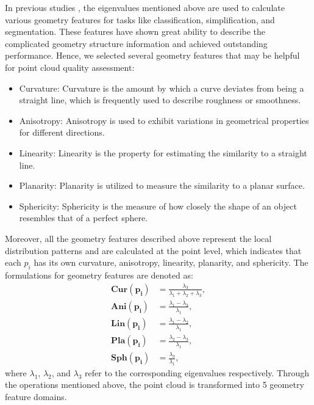 \documentclass[lettersize,journal]{IEEEtran}
\begin{document}
In previous studies \cite{pcqa-curvature2} \cite{pc-eigenvalue1}, the eigenvalues mentioned above are used to calculate various geometry features for tasks like classification, simplification, and segmentation. These features have shown great ability to describe the complicated geometry structure information and achieved outstanding performance. Hence, we selected several geometry features that may be helpful for point cloud quality assessment: 
\begin{itemize}
    \item Curvature: Curvature is the amount by which a curve deviates from being a straight line, which is frequently used to describe roughness or smoothness.
    \item Anisotropy: Anisotropy is used to exhibit variations in geometrical properties for different directions.
    \item Linearity: Linearity is the property for estimating the similarity to a straight line.
    \item Planarity: Planarity is utilized to measure the similarity to a planar surface.
    \item Sphericity: Sphericity is the measure of how closely the shape of an object resembles that of a perfect sphere. 
\end{itemize}


Moreover, all the geometry features described above represent the local distribution patterns and are calculated at the point level, which indicates that each $p_{i}$ has its own curvature, anisotropy, linearity, planarity, and sphericity.
The formulations \cite{pc-eigenvalue2} for geometry features are denoted as:
\begin{align}
     \boldsymbol{Cur(p_{i})}&= \frac{\lambda_{3}}{\lambda_{1}+\lambda_{2}+\lambda_{3}}, \\
     \boldsymbol{Ani(p_{i})}&= \frac{\lambda_{1}-\lambda_{3}}{\lambda_{1}}, \\
    \boldsymbol{Lin(p_{i})}&= \frac{\lambda_{1}-\lambda_{2}}{\lambda_{1}}, \\
    \boldsymbol{Pla(p_{i})}&= \frac{\lambda_{2}-\lambda_{3}}{\lambda_{1}}, \\
    \boldsymbol{Sph(p_{i})}&= \frac{\lambda_{3}}{\lambda_{1}}, 
\end{align}
where $\lambda_{1}$, $\lambda_{2}$, and $\lambda_{3}$ refer to the corresponding eigenvalues respectively. Through the operations mentioned above, the point cloud is transformed into 5 geometry feature domains. 
\end{document}
